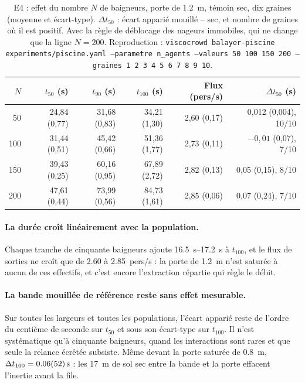 \begin{table}[ht]
\centering
\caption{E4 : effet du nombre $N$ de baigneurs, porte de \SI{1.2}{\metre}, témoin sec,
dix graines (moyenne et écart-type). $\Delta t_{50}$ : écart apparié mouillé -- sec, et
nombre de graines où il est positif. Avec la règle de déblocage des nageurs immobiles,
qui ne change que la ligne $N=200$. Reproduction : \texttt{viscocrowd balayer-piscine
experiments/piscine.yaml --parametre n\_agents --valeurs 50 100 150 200 --graines 1 2 3 4
5 6 7 8 9 10}.}
\label{tab:e4-population}
\begin{tabular}{rrrrrr}
\toprule
$N$ & $t_{50}$ (s) & $t_{90}$ (s) & $t_{100}$ (s) & Flux (pers/s) & $\Delta t_{50}$ (s) \\
\midrule
50 & 24,84 (0,77) & 31,68 (0,83) & 34,21 (1,30) & 2,60 (0,17) & 0,012 (0,004), 10/10 \\
100 & 31,44 (0,51) & 45,42 (0,66) & 51,36 (1,77) & 2,73 (0,11) & $-0{,}01$ (0,07), 7/10 \\
150 & 39,43 (0,25) & 60,16 (0,95) & 67,89 (2,72) & 2,82 (0,13) & 0,05 (0,15), 8/10 \\
200 & 47,61 (0,44) & 73,99 (0,56) & 84,73 (1,61) & 2,85 (0,06) & 0,07 (0,24), 7/10 \\
\bottomrule
\end{tabular}
\end{table}

\paragraph{La durée croît linéairement avec la population.}
Chaque tranche de cinquante baigneurs ajoute \SIrange{16.5}{17.2}{\second} à $t_{100}$,
et le flux de sorties ne croît que de \num{2.60} à \num{2.85}~pers/s : la porte de
\SI{1.2}{\metre} n'est saturée à aucun de ces effectifs, et c'est encore l'extraction
répartie qui règle le débit.

\paragraph{La bande mouillée de référence reste sans effet mesurable.}
Sur toutes les largeurs et toutes les populations, l'écart apparié reste de l'ordre du
centième de seconde sur $t_{50}$ et sous son écart-type sur $t_{100}$. Il n'est systématique
qu'à cinquante baigneurs, quand les interactions sont rares et que seule la relance écrêtée
subsiste. Même devant la porte saturée de \SI{0.8}{\metre},
$\Delta t_{100}=\SI{0.06 \pm 0.52}{\second}$ : les \SI{17}{\metre} de sol sec entre la bande
et la porte effacent l'inertie avant la file.

